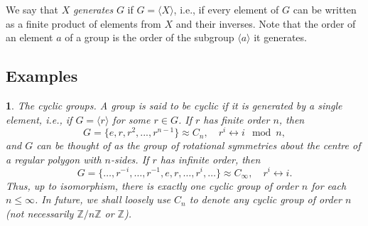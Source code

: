 \documentclass[a4paper,11pt,final,openany]{memoir}%
\newtheorem{plain}[X]{}
\theoremstyle{nonumberplain}
\begin{document}
We say that $X$ \emph{generates}%
$G$ if $G=\langle X\rangle$, i.e., if every element of $G$ can be written as a
finite product of elements from $X$ and their inverses. Note that the order of
an element $a$ of a group is the order of the subgroup $\langle a\rangle$ it generates.

\subsection{Examples}

\begin{plain}
\label{bd8a}\emph{The cyclic groups. }A group is said to be \emph{cyclic}%
%
\emph{\/} if it is generated by a single element, i.e., if $G=\langle
r\rangle$ for some $r\in G$. If $r$ has finite order $n$, then
\[
G=\{e,r,r^{2},...,r^{n-1}\}\approx C_{n},\quad r^{i}\leftrightarrow i\mod n,
\]
and $G$ can be thought of as the group of rotational symmetries about the
centre of a regular polygon with $n$-sides. If $r$ has infinite order, then
\[
G=\{\ldots,r^{-}{}^{i},\ldots,r^{-1},e,r,\ldots,r^{i},\ldots\}\approx
C_{\infty},\quad r^{i}\leftrightarrow i.
\]
Thus, up to isomorphism, there is exactly one cyclic group of order $n$ for
each $n\leq\infty$. In future, we shall loosely use $C_{n}$ to denote any
cyclic group of order $n$ (not necessarily $\mathbb{Z}{}/n\mathbb{Z}{}$ or
$\mathbb{Z}{}$).
\end{plain}
\end{document}
